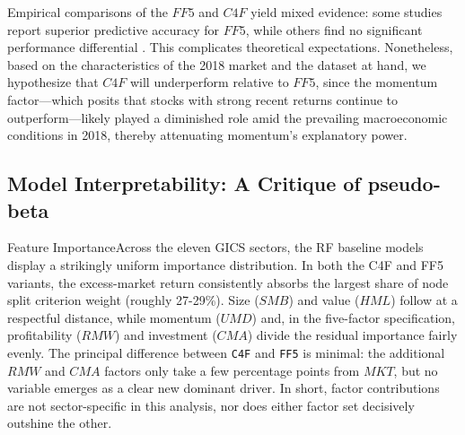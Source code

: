 Empirical comparisons of the $FF5$ and $C4F$ yield mixed evidence: some studies report superior predictive accuracy for $FF5$, while others find no significant performance differential \cite{cooper_2017,hou_2016}. This complicates theoretical expectations. Nonetheless, based on the characteristics of the 2018 market and the dataset at hand, we hypothesize that $C4F$ will underperform relative to $FF5$, since the momentum factor—which posits that stocks with strong recent returns continue to outperform—likely played a diminished role amid the prevailing macroeconomic conditions in 2018, thereby attenuating momentum's explanatory power.

\subsection{Model Interpretability: A Critique of pseudo-beta}




{Feature Importance}Across the eleven GICS sectors, the RF baseline models display a strikingly uniform importance distribution. In both the C4F and FF5 variants, the excess-market return consistently absorbs the largest share of node split criterion weight (roughly 27-29\%). Size ($SMB$) and value ($HML$) follow at a respectful distance, while momentum ($UMD$) and, in the five-factor specification, profitability ($RMW$) and investment ($CMA$) divide the residual importance fairly evenly. The principal difference between \texttt{C4F} and \texttt{FF5} is minimal: the additional $RMW$ and $CMA$ factors only take a few percentage points from $MKT$, but no variable emerges as a clear new dominant driver. In short, factor contributions are not sector-specific in this analysis, nor does either factor set decisively outshine the other.

